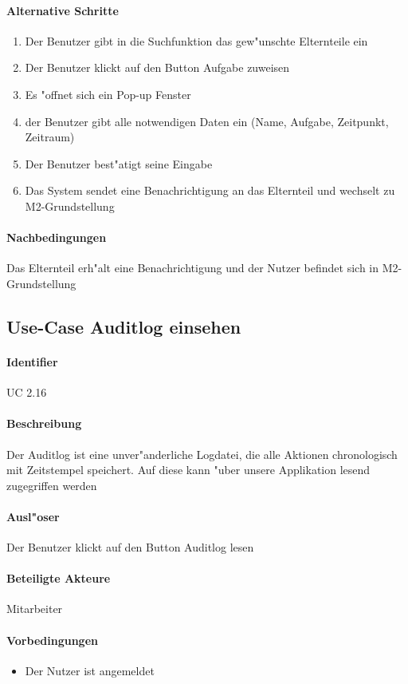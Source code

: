  \paragraph{Alternative Schritte}
  \begin{enumerate}
   \item Der Benutzer gibt in die Suchfunktion das gew"unschte Elternteile ein
   \item Der Benutzer klickt auf den Button \dq Aufgabe zuweisen\dq
   \item Es "offnet sich ein Pop-up Fenster
  \item der Benutzer gibt alle notwendigen Daten ein (Name, Aufgabe, Zeitpunkt, Zeitraum)
  \item Der Benutzer best"atigt seine Eingabe
  \item Das System sendet eine Benachrichtigung an das Elternteil und wechselt zu M2-Grundstellung
  \end{enumerate}
  \paragraph{Nachbedingungen}
  Das Elternteil erh"alt eine Benachrichtigung und der Nutzer befindet sich in M2-Grundstellung

  
  \newpage
 \subsection{Use-Case Auditlog einsehen}
  \paragraph{Identifier}
  UC 2.16
  \paragraph{Beschreibung}
  Der Auditlog ist eine unver"anderliche Logdatei, die alle Aktionen chronologisch mit Zeitstempel speichert. Auf diese kann "uber unsere Applikation lesend zugegriffen werden 
  \paragraph{Ausl"oser}
  Der Benutzer klickt auf den Button \dq Auditlog lesen\dq
  \paragraph{Beteiligte Akteure}   \leavevmode \newline
    Mitarbeiter
  \paragraph{Vorbedingungen}
  \begin{itemize}
   \item Der Nutzer ist angemeldet
  \end{itemize}

